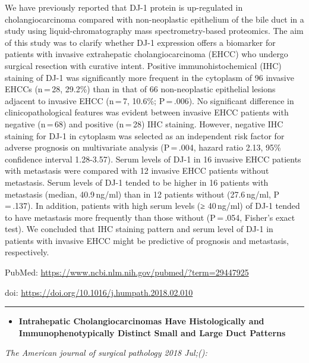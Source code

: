 \documentclass[]{article}
\providecommand{\tightlist}{%
  \setlength{\itemsep}{0pt}\setlength{\parskip}{0pt}}
\begin{document}
We have previously reported that DJ-1 protein is up-regulated in
cholangiocarcinoma compared with non-neoplastic epithelium of the bile
duct in a study using liquid-chromatography mass spectrometry-based
proteomics. The aim of this study was to clarify whether DJ-1 expression
offers a biomarker for patients with invasive extrahepatic
cholangiocarcinoma (EHCC) who undergo surgical resection with curative
intent. Positive immunohistochemical (IHC) staining of DJ-1 was
significantly more frequent in the cytoplasm of 96 invasive EHCCs
(n\,=\,28, 29.2\%) than in that of 66 non-neoplastic epithelial lesions
adjacent to invasive EHCC (n\,=\,7, 10.6\%; P\,=\,.006). No significant
difference in clinicopathological features was evident between invasive
EHCC patients with negative (n\,=\,68) and positive (n\,=\,28) IHC
staining. However, negative IHC staining for DJ-1 in cytoplasm was
selected as an independent risk factor for adverse prognosis on
multivariate analysis (P\,=\,.004, hazard ratio 2.13, 95\% confidence
interval 1.28-3.57). Serum levels of DJ-1 in 16 invasive EHCC patients
with metastasis were compared with 12 invasive EHCC patients without
metastasis. Serum levels of DJ-1 tended to be higher in 16 patients with
metastasis (median, 40.9\,ng/ml) than in 12 patients without
(27.6\,ng/ml, P\,=\,.137). In addition, patients with high serum levels
(≥ 40\,ng/ml) of DJ-1 tended to have metastasis more frequently than
those without (P\,=\,.054, Fisher's exact test). We concluded that IHC
staining pattern and serum level of DJ-1 in patients with invasive EHCC
might be predictive of prognosis and metastasis, respectively.

PubMed: \url{https://www.ncbi.nlm.nih.gov/pubmed/?term=29447925}

doi: \url{https://doi.org/10.1016/j.humpath.2018.02.010}

{}

{}

\begin{center}\rule{0.5\linewidth}{\linethickness}\end{center}

\begin{itemize}
\tightlist
\item
  \textbf{Intrahepatic Cholangiocarcinomas Have Histologically and
  Immunophenotypically Distinct Small and Large Duct Patterns}
\end{itemize}

\emph{The American journal of surgical pathology 2018 Jul;():}
\end{document}
